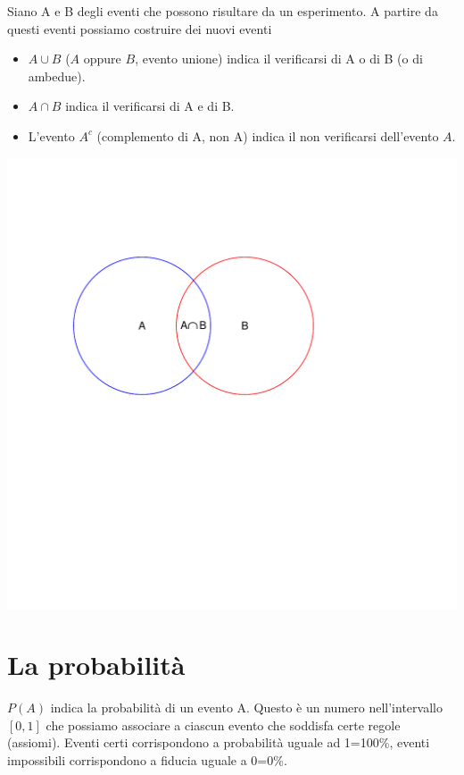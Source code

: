 \documentclass[onecolumn,12pt]{book}\usepackage[]{graphicx}\usepackage[]{color}
\makeatletter
\def\maxwidth{ %
  \ifdim\Gin@nat@width>\linewidth
    \linewidth
  \else
    \Gin@nat@width
  \fi
}
\newenvironment{knitrout}{}{} %
\makeatother
\begin{document}
Siano A e  B degli eventi che possono risultare da un esperimento. A partire da questi eventi possiamo costruire dei nuovi eventi
\begin{itemize}
\item $A\cup B$ ($A$ oppure $B$, evento unione) indica il verificarsi di A o di B (o di ambedue).
\item $A \cap  B$  indica il verificarsi di A e di  B.
\item L'evento  $A^c$ (complemento di A, non A)   indica il non verificarsi dell'evento $A$.   
\end{itemize}
\begin{knitrout}
\color{fgcolor}
\includegraphics[width=\maxwidth]{figure/unnamed-chunk-69-1} 

\end{knitrout}


\section{La probabilità}

$P(A)$ indica la probabilità di un evento A. Questo è un numero nell'intervallo $[0,1]$ che possiamo associare a ciascun evento che soddisfa certe regole (assiomi).
Eventi certi corrispondono a probabilità uguale ad 1=100\%, eventi impossibili corrispondono a fiducia uguale a 0=0\%.
\end{document}
